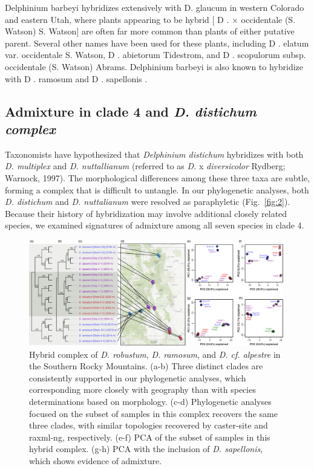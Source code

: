 \documentclass[11pt]{article}
\begin{document}
Delphinium barbeyi hybridizes extensively with D. glaucum in western Colorado and eastern Utah, where plants appearing to be hybrid [ D . × occidentale (S. Watson) S. Watson] are often far more common than plants of either putative parent. Several other names have been used for these plants, including D . elatum var. occidentale S. Watson, D . abietorum Tidestrom, and D . scopulorum subsp. occidentale (S. Watson) Abrams. Delphinium barbeyi is also known to hybridize with D . ramosum and D . sapellonis .


\subsection{Admixture in clade 4 and \emph{D. distichum complex}}
Taxonomists have hypothesized that \emph{Delphinium distichum} hybridizes with both 
\emph{D. multiplex} and \emph{D. nuttallianum} 
(referred to as \emph{D.} x \emph{diversicolor} Rydberg; Warnock, 1997).
% 
The morphological differences among these three taxa are subtle, forming a complex that 
is difficult to untangle. 
% 
In our phylogenetic analyses, both \emph{D. distichum} and \emph{D. nuttalianum} were
resolved as paraphyletic (Fig.~\ref{fig:2}). Because their history of hybridization
may involve additional closely related species, we examined signatures of admixture
among all seven species in clade 4. 
% 

\begin{figure}[t!]
	\centering
	  \includegraphics[width=0.99\textwidth]{./figures/ramosum-robustum-alpestre2}	
	\caption{
        Hybrid complex of \emph{D. robustum}, \emph{D. ramosum}, and \emph{D. cf. alpestre} in the Southern Rocky Mountains. 
        (a-b) Three distinct clades are consistently supported in our phylogenetic analyses, which corresponding more closely with geography than with species determinations based on morphology.
        (c-d) Phylogenetic analyses focused on the subset of samples in this complex
        recovers the same three clades, with similar topologies recovered by caster-site and raxml-ng, respectively.
        (e-f) PCA of the subset of samples in this hybrid complex.
        (g-h) PCA with the inclusion of \emph{D. sapellonis}, which shows evidence of admixture.        
	}
	\label{fig:robustum}
\end{figure}
\end{document}
